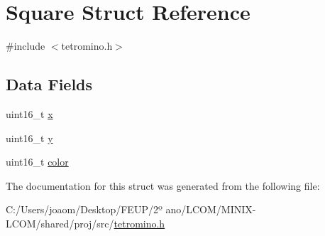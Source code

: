\hypertarget{struct_square}{}\section{Square Struct Reference}
\label{struct_square}


{\ttfamily \#include $<$tetromino.\+h$>$}

\subsection*{Data Fields}
\begin{DoxyCompactItemize}
\item 
uint16\+\_\+t \mbox{\hyperlink{group__tetramino_ga4dde988b1b2adba65ae3efa69f65d960}{x}}
\item 
uint16\+\_\+t \mbox{\hyperlink{group__tetramino_gab0580f504a7428539be299fa71565f30}{y}}
\item 
uint16\+\_\+t \mbox{\hyperlink{group__tetramino_ga0b10c5b0fa8e65e009263b93ba2671ae}{color}}
\end{DoxyCompactItemize}


The documentation for this struct was generated from the following file\+:\begin{DoxyCompactItemize}
\item 
C\+:/\+Users/joaom/\+Desktop/\+F\+E\+U\+P/2º ano/\+L\+C\+O\+M/\+M\+I\+N\+I\+X-\/\+L\+C\+O\+M/shared/proj/src/\mbox{\hyperlink{tetromino_8h}{tetromino.\+h}}\end{DoxyCompactItemize}
